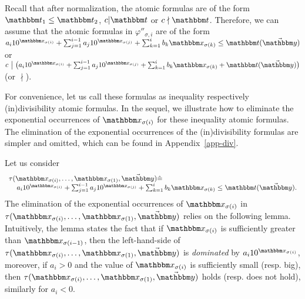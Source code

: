 Recall that after normalization, the atomic formulas are of the form $\iterm_1 \le \iterm_2$, $c | \iterm$ or $c \nmid \iterm$. Therefore, we can assume that the atomic formulas in $\varphi''_{\sigma,i}$ are  of the form 
%
$a_i 10^{\ivarx_{\sigma(i)}}+\sum_{j=1}^{i-1} a_j 10^{\ivarx_{\sigma(j)}} + \sum_{k=1}^{i}b_k \ivarx_{\sigma(k)} \le \iterm(\vec{\ivary})$
or  
$c \ \big  | \ \big(a_i 10^{\ivarx_{\sigma(i)}}+\sum_{j=1}^{i-1} a_j 10^{\ivarx_{\sigma(j)}} + \sum_{k=1}^{i}b_k \ivarx_{\sigma(k)} + \iterm(\vec{\ivary})\big)$
(or $\nmid$).

For convenience, let us call these formulas as inequality respectively (in)divisibility atomic formulas. In the sequel, we illustrate how to eliminate the exponential occurrences of $\ivarx_{\sigma(i)}$ for these inequality atomic formulas. The elimination of the exponential occurrences of the (in)divisibility formulas are simpler and omitted, which can be found in Appendix~\ref{app-div}. 

Let us consider 
$$
\begin{array}{l}
\tau(\ivarx_{\sigma(i)}, \ldots, \ivarx_{\sigma(1)}, \vec{\ivary}) \Def  \\
\hspace{4mm} 
a_i 10^{\ivarx_{\sigma(i)}}+\sum_{j=1}^{i-1} a_j 10^{\ivarx_{\sigma(j)}} + \sum_{k=1}^{i}b_k \ivarx_{\sigma(k)} \le \iterm(\vec{\ivary}).
\end{array}
$$
%
The elimination of the exponential occurrences of $\ivarx_{\sigma(i)}$ in $\tau(\ivarx_{\sigma(i)}, \ldots, \ivarx_{\sigma(1)}, \vec{\ivary})$ relies on the following lemma. Intuitively, the lemma states the fact that if $\ivarx_{\sigma(i)}$ is sufficiently greater than $\ivarx_{\sigma(i-1)}$, then the left-hand-side of $\tau(\ivarx_{\sigma(i)}, \ldots, \ivarx_{\sigma(1)}, \vec{\ivary})$ is \emph{dominated} by $a_i10^{\ivarx_{\sigma(i)}}$, moreover, if $a_i > 0$ and the value of $\ivarx_{\sigma(i)}$ is sufficiently small (resp. big), then $\tau(\ivarx_{\sigma(i)}, \ldots, \ivarx_{\sigma(1)}, \vec{\ivary})$ holds (resp. does not hold), similarly for $a_i < 0$.

